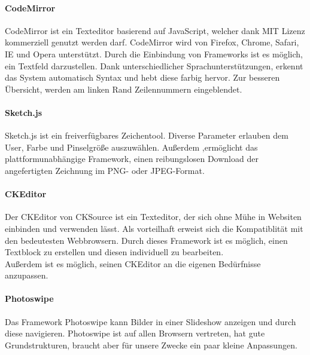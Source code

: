 \paragraph{CodeMirror}
CodeMirror ist ein Texteditor basierend auf JavaScript, welcher dank MIT Lizenz kommerziell genutzt werden darf. CodeMirror wird von Firefox, Chrome, Safari, IE und Opera unterstützt. Durch die Einbindung von Frameworks ist es möglich, ein Textfeld darzustellen. Dank unterschiedlicher Sprachunterstützungen, erkennt das System automatisch Syntax und hebt diese farbig hervor. Zur besseren Übersicht, werden am linken Rand Zeilennummern eingeblendet. \cite{CODEMIRROR}


\paragraph{Sketch.js}
Sketch.js ist ein freiverfügbares Zeichentool. Diverse Parameter erlauben dem User, Farbe und Pinselgröße auszuwählen. Außerdem ,ermöglicht das plattformunabhängige Framework, einen reibungslosen Download der angefertigten Zeichnung im PNG- oder JPEG-Format. \cite{SKETCH}


\paragraph{CKEditor}
Der CKEditor von CKSource ist ein Texteditor, der sich ohne Mühe in Websiten einbinden und verwenden lässt. Als vorteilhaft erweist sich die Kompatiblität mit den bedeutesten Webbrowsern. Durch dieses Framework ist es möglich, einen Textblock zu erstellen und diesen individuell zu bearbeiten.\\

Außerdem ist es möglich, seinen CKEditor an die eigenen Bedürfnisse anzupassen.\cite{CKEDITOR}


\paragraph{Photoswipe}
Das Framework Photoswipe kann Bilder in einer Slideshow anzeigen und durch diese navigieren. Photoswipe ist auf allen Browsern vertreten, hat gute Grundstrukturen, braucht aber für unsere Zwecke ein paar kleine Anpassungen. \cite{PHOTOSWIPE}

